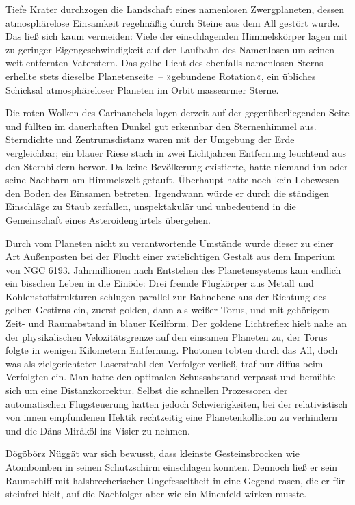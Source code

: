 Tiefe Krater durchzogen die Landschaft eines namenlosen Zwergplaneten, dessen atmosphärelose Einsamkeit regelmäßig durch Steine aus dem All gestört wurde. Das ließ sich kaum vermeiden: Viele der einschlagenden Himmelskörper lagen mit zu geringer Eigengeschwindigkeit auf der Laufbahn des Namenlosen um seinen weit entfernten Vaterstern. Das gelbe Licht des ebenfalls namenlosen Sterns erhellte stets dieselbe Planetenseite~– »gebundene Rotation«, ein übliches Schicksal atmosphäreloser Planeten im Orbit massearmer Sterne.

Die roten Wolken des Carinanebels lagen derzeit auf der gegenüberliegenden Seite und füllten im dauerhaften Dunkel gut erkennbar den Sternenhimmel aus. Sterndichte und Zentrumsdistanz waren mit der Umgebung der Erde vergleichbar; ein blauer Riese stach in zwei Lichtjahren Entfernung leuchtend aus den Sternbildern hervor. Da keine Bevölkerung existierte, hatte niemand ihn oder seine Nachbarn am Himmelszelt getauft. Überhaupt hatte noch kein Lebewesen den Boden des Einsamen betreten. Irgendwann würde er durch die ständigen Einschläge zu Staub zerfallen, unspektakulär und unbedeutend in die Gemeinschaft eines Asteroidengürtels übergehen.

Durch vom Planeten nicht zu verantwortende Umstände wurde dieser zu einer Art Außenposten bei der Flucht einer zwielichtigen Gestalt aus dem Imperium von NGC 6193. Jahrmillionen nach Entstehen des Planetensystems kam endlich ein bisschen Leben in die Einöde: Drei fremde Flugkörper aus Metall und Kohlenstoffstrukturen schlugen parallel zur Bahnebene aus der Richtung des gelben Gestirns ein, zuerst golden, dann als weißer Torus, und mit gehörigem Zeit- und Raumabstand in blauer Keilform. Der goldene Lichtreflex hielt nahe an der physikalischen Velozitätsgrenze auf den einsamen Planeten zu, der Torus folgte in wenigen Kilometern Entfernung. Photonen tobten durch das All, doch was als zielgerichteter Laserstrahl den Verfolger verließ, traf nur diffus beim Verfolgten ein. Man hatte den optimalen Schussabstand verpasst und bemühte sich um eine Distanzkorrektur. Selbst die schnellen Prozessoren der automatischen Flugsteuerung hatten jedoch Schwierigkeiten, bei der relativistisch von innen empfundenen Hektik rechtzeitig eine Planetenkollision zu verhindern und die Däns Miräköl ins Visier zu nehmen.

Dögöbörz Nüggät war sich bewusst, dass kleinste Gesteinsbrocken wie Atombomben in seinen Schutzschirm einschlagen konnten. Dennoch ließ er sein Raumschiff mit halsbrecherischer Ungefesseltheit in eine Gegend rasen, die er für steinfrei hielt, auf die Nachfolger aber wie ein Minenfeld wirken musste.

